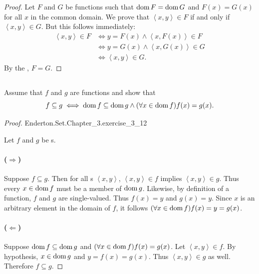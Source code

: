 \documentclass{report}
\newcommand{\pair}[1]{\left< #1 \right>}
\begin{document}
\begin{proof}


  Let $F$ and $G$ be functions such that $\mathop{\text{dom}}{F} = \mathop{\text{dom}}{G}$ and $F(x) = G(x)$
    for all $x$ in the common domain.
  We prove that $\pair{x, y} \in F$ if and only if $\pair{x, y} \in G$.
  But this follows immediately:
    \begin{align*}
      \pair{x, y} \in F
        & \iff y = F(x) \land \pair{x, F(x)} \in F \\
        & \iff y = G(x) \land \pair{x, G(x)} \in G \\
        & \iff \pair{x, y} \in G.
    \end{align*}
  By the , $F = G$.

\end{proof}

\subsection{}%

Assume that $f$ and $g$ are functions and show that
  $$f \subseteq g \iff \mathop{\text{dom}}{f} \subseteq \mathop{\text{dom}}{g} \land
    (\forall x \in \mathop{\text{dom}}{f}) f(x) = g(x).$$

\begin{proof}

    {Enderton.Set.Chapter\_3.exercise\_3\_12}

  Let $f$ and $g$ be s.

  \paragraph{($\Rightarrow$)}%

    Suppose $f \subseteq g$.
    Then for all s $\pair{x, y}$,
      $\pair{x, y} \in f$ implies $\pair{x, y} \in g$.
    Thus every $x \in \mathop{\text{dom}}{f}$ must be a member of $\mathop{\text{dom}}{g}$.
    Likewise, by definition of a function, $f$ and $g$ are single-valued.
    Thus $f(x) = y$ and $g(x) = y$.
    Since $x$ is an arbitrary element in the domain of $f$, it follows
      $(\forall x \in \mathop{\text{dom}}{f}) f(x) = y = g(x)$.

  \paragraph{($\Leftarrow$)}%

    Suppose $\mathop{\text{dom}}{f} \subseteq \mathop{\text{dom}}{g}$ and
      $(\forall x \in \mathop{\text{dom}}{f}) f(x) = g(x)$.
    Let $\pair{x, y} \in f$.
    By hypothesis, $x \in \mathop{\text{dom}}{g}$ and $y = f(x) = g(x)$.
    Thus $\pair{x, y} \in g$ as well.
    Therefore $f \subseteq g$.

\end{proof}
\end{document}
